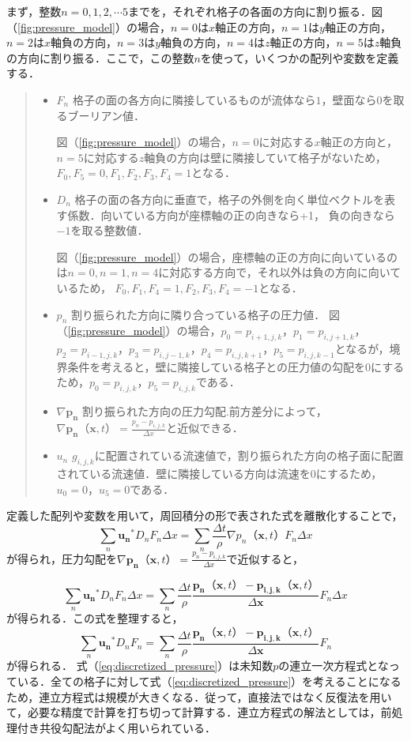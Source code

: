 \documentclass[a4j,12pt]{jreport}
\begin{document}
まず，整数$n=0,1,2,\cdots 5$までを，それぞれ格子の各面の方向に割り振る．図（\ref{fig:pressure_model}）の場合，$n=0$は$x$軸正の方向，$n=1$は$y$軸正の方向，$n=2$は$x$軸負の方向，$n=3$は$y$軸負の方向，$n=4$は$z$軸正の方向，$n=5$は$z$軸負の方向に割り振る．ここで，この整数$n$を使って，いくつかの配列や変数を定義する．
\begin{quote}
	\begin{itemize}
		\item $F_n$ 格子の面の各方向に隣接しているものが流体なら$1$，壁面なら$0$を取るブーリアン値．
		
		図（\ref{fig:pressure_model}）の場合，$n=0$に対応する$x$軸正の方向と，$n=5$に対応する$z$軸負の方向は壁に隣接していて格子がないため，$F_0,F_5 = 0,F_1,F_2,F_3,F_4 = 1$となる．
		\item $D_n$ 格子の面の各方向に垂直で，格子の外側を向く単位ベクトルを表す係数．向いている方向が座標軸の正の向きなら+1，					負の向きなら$-1$を取る整数値．
		
		図（\ref{fig:pressure_model}）の場合，座標軸の正の方向に向いているのは$n=0,n=1,n=4$に対応する方向で，それ以外は負の方向に向いているため，
		$F_0,F_1,F_4 = 1,F_2,F_3,F_4 = -1$となる．
		\item $p_n$ 割り振られた方向に隣り合っている格子の圧力値．
		図（\ref{fig:pressure_model}）の場合，$p_0 = p_{i+1,j,k}$，$p_1 = p_{i,j+1,k}$，$p_2 = p_{i-1,j,k}$，$p_3 = p_{i,j-1,k}$，$p_4 = p_{i,j,k+1}$，$p_5 = p_{i,j,k-1}$となるが，境界条件を考えると，壁に隣接している格子との圧力値の勾配を$0$にするため，$p_0 = p_{i,j,k}$，$p_5 = p_{i,j,k}$である．
		\item $\nabla\bm{p_n}$ 割り振られた方向の圧力勾配.前方差分によって，$\nabla \bm{p_n}（\bm{x},t） = \frac{p_n - p_{i,j,k}}{\varDelta x}$と近似できる．
		\item $u_n$ $g_{i,j,k}$に配置されている流速値で，割り振られた方向の格子面に配置されている流速値．壁に隣接している方向は流速を$0$にするため，$u_0 = 0$，$u_5 = 0$である．
	\end{itemize}
\end{quote}

定義した配列や変数を用いて，周回積分の形で表された式を離散化することで，
$$ \sum_{n}\bm{u_n}^*D_nF_n\varDelta x = \sum_{n}\frac{\varDelta t}{\rho}\nabla p_n（\bm{x},t）F_n\varDelta x $$
が得られ，圧力勾配を$\nabla \bm{p_n}（\bm{x},t） = \frac{p_n - p_{i,j,k}}{\varDelta x}$で近似すると，

$$ \sum_{n}\bm{u_n}^*D_nF_n\varDelta x = \sum_{n}\frac{\varDelta t}{\rho}\frac{\bm{p_n}（\bm{x},t） - \bm{p_{i,j,k}}（\bm{x},t）}{\varDelta \bm{x}}F_n\varDelta x $$
が得られる．この式を整理すると，
\begin{equation}\label{eq:discretized_pressure}
\sum_{n}\bm{u_n}^*D_nF_n= \sum_{n}\frac{\varDelta t}{\rho}\frac{\bm{p_n}（\bm{x},t） - \bm{p_{i,j,k}}（\bm{x},t）}{\varDelta \bm{x}}F_n
\end{equation} 
が得られる．
式（\ref{eq:discretized_pressure}）は未知数$p$の連立一次方程式となっている．全ての格子に対して式（\ref{eq:discretized_pressure}）を考えることになるため，連立方程式は規模が大きくなる．従って，直接法ではなく反復法を用いて，必要な精度で計算を打ち切って計算する．連立方程式の解法としては，前処理付き共役勾配法がよく用いられている．
\end{document}
